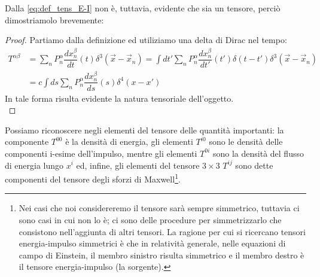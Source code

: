 Dalla \eqref{eq:def_tens_E-I} non è, tuttavia, evidente che sia un tensore, perciò dimostriamolo brevemente:
\begin{proof}
    Partiamo dalla definizione ed utiliziamo una delta di Dirac nel tempo:
    \begin{equation}
  \begin{aligned}
      T^{\alpha \beta}&=\sum_nP^\alpha_n\dfrac{dx^\beta_n}{dt}(t)\delta^3(\Vec{x}-\Vec{x}_n)=\int dt'\sum_nP^\alpha_n\dfrac{dx^\beta_n}{dt'}(t')\delta(t-t')\delta^3(\Vec{x}-\Vec{x}_n)\\
      &=c\int ds\sum_nP^\alpha_n\dfrac{dx^\beta_n}{ds}(s)\delta^4(x-x')
  \end{aligned}
\end{equation}
In tale forma risulta evidente la natura tensoriale dell'oggetto.\\
\end{proof}
Possiamo riconoscere negli elementi del tensore delle quantità importanti: la componente $T^{00}$ è la densità di energia, gli elementi $T^{i0}$ sono le densità delle componenti i-esime dell'impulso, mentre gli elementi $T^{0i}$ sono la densità del flusso di energia lungo $x^i$ ed, infine, gli elementi del tensore $3\times3$ $T^{ij}$ sono dette componenti del tensore degli sforzi di Maxwell\footnote{Nei casi che noi considereremo il tensore sarà sempre simmetrico, tuttavia ci sono casi in cui non lo è; ci sono delle procedure per simmetrizzarlo che consistono nell'aggiunta di altri tensori. La ragione per cui si ricercano tensori energia-impulso simmetrici è che in relatività generale, nelle equazioni di campo di Einstein, il membro sinistro risulta simmetrico e il membro destro è il tensore energia-impulso (la sorgente).}.

